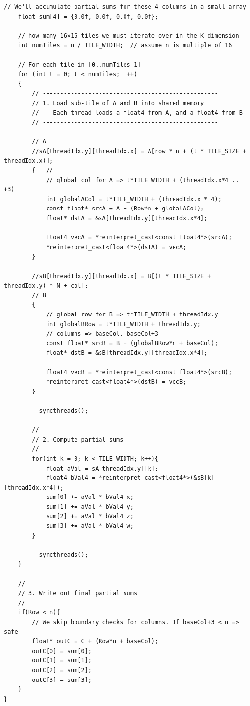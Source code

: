 \begin{lstlisting}[style=mystyle]
    // We'll accumulate partial sums for these 4 columns in a small array
    float sum[4] = {0.0f, 0.0f, 0.0f, 0.0f};

    // how many 16×16 tiles we must iterate over in the K dimension
    int numTiles = n / TILE_WIDTH;  // assume n is multiple of 16

    // For each tile in [0..numTiles-1]
    for (int t = 0; t < numTiles; t++)
    {
        // --------------------------------------------------
        // 1. Load sub-tile of A and B into shared memory
        //    Each thread loads a float4 from A, and a float4 from B
        // --------------------------------------------------

        // A
        //sA[threadIdx.y][threadIdx.x] = A[row * n + (t * TILE_SIZE + threadIdx.x)];
        {   //
            // global col for A => t*TILE_WIDTH + (threadIdx.x*4 .. +3)
            int globalACol = t*TILE_WIDTH + (threadIdx.x * 4);
            const float* srcA = A + (Row*n + globalACol);
            float* dstA = &sA[threadIdx.y][threadIdx.x*4];

            float4 vecA = *reinterpret_cast<const float4*>(srcA);
            *reinterpret_cast<float4*>(dstA) = vecA;
        }

        //sB[threadIdx.y][threadIdx.x] = B[(t * TILE_SIZE + threadIdx.y) * N + col];
        // B
        {
            // global row for B => t*TILE_WIDTH + threadIdx.y
            int globalBRow = t*TILE_WIDTH + threadIdx.y;
            // columns => baseCol..baseCol+3
            const float* srcB = B + (globalBRow*n + baseCol);
            float* dstB = &sB[threadIdx.y][threadIdx.x*4];

            float4 vecB = *reinterpret_cast<const float4*>(srcB);
            *reinterpret_cast<float4*>(dstB) = vecB;
        }

        __syncthreads();

        // --------------------------------------------------
        // 2. Compute partial sums
        // --------------------------------------------------
        for(int k = 0; k < TILE_WIDTH; k++){
            float aVal = sA[threadIdx.y][k];
            float4 bVal4 = *reinterpret_cast<float4*>(&sB[k][threadIdx.x*4]);
            sum[0] += aVal * bVal4.x;
            sum[1] += aVal * bVal4.y;
            sum[2] += aVal * bVal4.z;
            sum[3] += aVal * bVal4.w;
        }

        __syncthreads();
    }

    // --------------------------------------------------
    // 3. Write out final partial sums
    // --------------------------------------------------
    if(Row < n){
        // We skip boundary checks for columns. If baseCol+3 < n => safe
        float* outC = C + (Row*n + baseCol);
        outC[0] = sum[0];
        outC[1] = sum[1];
        outC[2] = sum[2];
        outC[3] = sum[3];
    }
}


\end{lstlisting}
